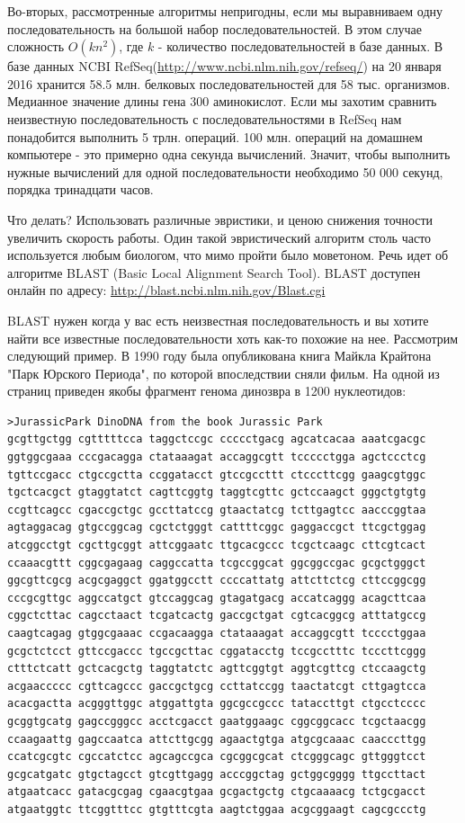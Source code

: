 \documentclass[letterpaper, 11pt]{article}
\begin{document}
Во-вторых, рассмотренные алгоритмы непригодны, если мы выравниваем одну последовательность на большой набор последовательностей. В этом случае сложность $O(kn^2)$, где $k$ - количество последовательностей в базе данных. В базе данных NCBI RefSeq(\url{http://www.ncbi.nlm.nih.gov/refseq/}) на 20 января 2016 хранится 58.5 млн. белковых последовательностей для 58 тыс. организмов. Медианное значение длины гена $300$ аминокислот. Если мы захотим сравнить неизвестную последовательность с последовательностями в RefSeq нам понадобится выполнить 5 трлн. операций. 100 млн. операций на домашнем компьютере - это примерно одна секунда вычислений. Значит, чтобы выполнить нужные вычислений для одной последовательности необходимо 50 000 секунд, порядка тринадцати часов.

Что делать? Использовать различные эвристики, и ценою снижения точности увеличить скорость работы. Один такой эвристический алгоритм столь часто используется любым биологом, что мимо пройти было моветоном. Речь идет об алгоритме BLAST (Basic Local Alignment Search Tool). BLAST доступен онлайн по адресу: \url{http://blast.ncbi.nlm.nih.gov/Blast.cgi}

BLAST нужен когда у вас есть неизвестная последовательность и вы хотите найти все известные последовательности хоть как-то похожие на нее. Рассмотрим следующий пример. В 1990 году была опубликована книга Майкла Крайтона "Парк Юрского Периода", по которой впоследствии сняли фильм. На одной из страниц приведен якобы фрагмент генома динозвра в 1200 нуклеотидов:

\begin{verbatim}
>JurassicPark DinoDNA from the book Jurassic Park
gcgttgctgg cgtttttcca taggctccgc ccccctgacg agcatcacaa aaatcgacgc
ggtggcgaaa cccgacagga ctataaagat accaggcgtt tccccctgga agctccctcg
tgttccgacc ctgccgctta ccggatacct gtccgccttt ctcccttcgg gaagcgtggc
tgctcacgct gtaggtatct cagttcggtg taggtcgttc gctccaagct gggctgtgtg
ccgttcagcc cgaccgctgc gccttatccg gtaactatcg tcttgagtcc aacccggtaa
agtaggacag gtgccggcag cgctctgggt cattttcggc gaggaccgct ttcgctggag
atcggcctgt cgcttgcggt attcggaatc ttgcacgccc tcgctcaagc cttcgtcact
ccaaacgttt cggcgagaag caggccatta tcgccggcat ggcggccgac gcgctgggct
ggcgttcgcg acgcgaggct ggatggcctt ccccattatg attcttctcg cttccggcgg
cccgcgttgc aggccatgct gtccaggcag gtagatgacg accatcaggg acagcttcaa
cggctcttac cagcctaact tcgatcactg gaccgctgat cgtcacggcg atttatgccg
caagtcagag gtggcgaaac ccgacaagga ctataaagat accaggcgtt tcccctggaa
gcgctctcct gttccgaccc tgccgcttac cggatacctg tccgcctttc tcccttcggg
ctttctcatt gctcacgctg taggtatctc agttcggtgt aggtcgttcg ctccaagctg
acgaaccccc cgttcagccc gaccgctgcg ccttatccgg taactatcgt cttgagtcca
acacgactta acgggttggc atggattgta ggcgccgccc tataccttgt ctgcctcccc
gcggtgcatg gagccgggcc acctcgacct gaatggaagc cggcggcacc tcgctaacgg
ccaagaattg gagccaatca attcttgcgg agaactgtga atgcgcaaac caacccttgg
ccatcgcgtc cgccatctcc agcagccgca cgcggcgcat ctcgggcagc gttgggtcct
gcgcatgatc gtgctagcct gtcgttgagg acccggctag gctggcgggg ttgccttact
atgaatcacc gatacgcgag cgaacgtgaa gcgactgctg ctgcaaaacg tctgcgacct
atgaatggtc ttcggtttcc gtgtttcgta aagtctggaa acgcggaagt cagcgccctg
\end{verbatim}
\end{document}
